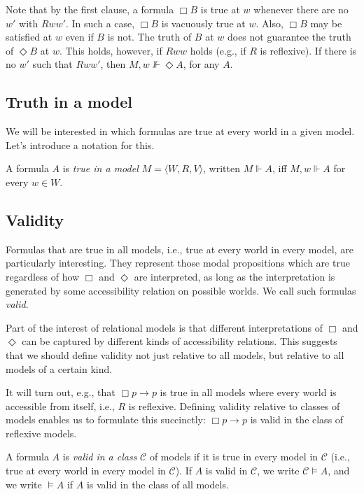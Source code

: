 Note that by the first clause, a formula $\Box B$ is true at $w$ whenever there 
are no $w'$ with $Rww'$. In such a case, $\Box B$ is vacuously true at $w$. 
Also, $\Box B$ may be satisfied at $w$ even if $B$ is not. The truth of $B$ 
at $w$ does not guarantee the truth of $\Diamond B$ at $w$. This holds, 
however, if $Rww$ holds (e.g., if $R$ is reflexive). If there is no $w'$ 
such that $Rww'$, then $M, w \not\Vdash \Diamond A$, for any $A$.


\subsection{Truth in a model}

We will be interested in which formulas are true at every 
world in a given model. Let’s introduce a notation for this.

\begin{definition}
  \label{true-in-model}
  \leanok
  A formula $A$ is \emph{true in a model} 
$M = \langle W, R, V \rangle$, written $M \Vdash A$, iff 
$M, w \Vdash A$ for every $w \in W$.
\end{definition}

\subsection{Validity}

Formulas that are true in all models, i.e., true at every world in 
every model, are particularly interesting. They represent those modal 
propositions which are true regardless of how $\Box$ and $\Diamond$ are 
interpreted, as long as the interpretation is generated by some accessibility 
relation on possible worlds. We call such formulas \emph{valid}.

Part of the interest of relational models is that different interpretations 
of $\Box$ and $\Diamond$ can be captured by different kinds of accessibility 
relations. This suggests that we should define validity not just relative to 
all models, but relative to all models of a certain kind.

It will turn out, e.g., that $\Box p \to p$ is true in all models where every 
world is accessible from itself, i.e., $R$ is reflexive. Defining validity 
relative to classes of models enables us to formulate this succinctly: 
$\Box p \to p$ is valid in the class of reflexive models.

\begin{definition}
  \label{valid-in-class}
  A formula $A$ is \emph{valid in a class} $\mathcal{C}$ 
of models if it is true in every model in $\mathcal{C}$ (i.e., true at every 
world in every model in $\mathcal{C}$). If $A$ is valid in $\mathcal{C}$, we 
write $\mathcal{C} \vDash A$, and we write $\vDash A$ if $A$ is valid in the 
class of all models.
\end{definition}

